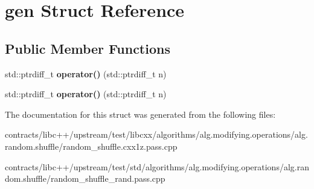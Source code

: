 \hypertarget{structgen}{}\section{gen Struct Reference}
\label{structgen}
\subsection*{Public Member Functions}
\begin{DoxyCompactItemize}
\item 
\mbox{\label{structgen_abe4c905fb2792b85604b49968f91082f}} 
std\+::ptrdiff\+\_\+t {\bfseries operator()} (std\+::ptrdiff\+\_\+t n)
\item 
\mbox{\label{structgen_abe4c905fb2792b85604b49968f91082f}} 
std\+::ptrdiff\+\_\+t {\bfseries operator()} (std\+::ptrdiff\+\_\+t n)
\end{DoxyCompactItemize}


The documentation for this struct was generated from the following files\+:\begin{DoxyCompactItemize}
\item 
contracts/libc++/upstream/test/libcxx/algorithms/alg.\+modifying.\+operations/alg.\+random.\+shuffle/random\+\_\+shuffle.\+cxx1z.\+pass.\+cpp\item 
contracts/libc++/upstream/test/std/algorithms/alg.\+modifying.\+operations/alg.\+random.\+shuffle/random\+\_\+shuffle\+\_\+rand.\+pass.\+cpp\end{DoxyCompactItemize}
